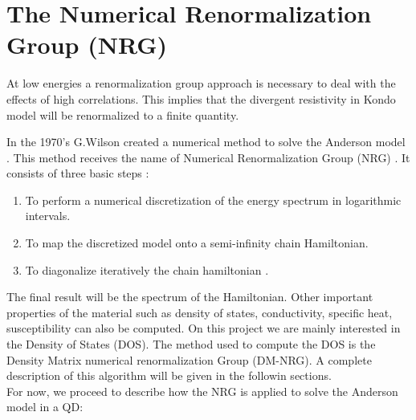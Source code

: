 \newpage












\section{The Numerical Renormalization Group\label{sec:The-Numerical-Renormaliztion} (NRG) }

 

At low energies a renormalization group approach is necessary to deal with the effects of high correlations. This implies that the divergent resistivity in Kondo model will be renormalized to a finite quantity. 
 


In the 1970's G.Wilson created a numerical method to solve the Anderson model . This method receives the name of Numerical Renormalization Group (NRG) \citep{bulla_numerical_2008,wilson_renormalization_1975,krishna-murthy_renormalization-group_1980}. It consists of three basic steps :
\begin{enumerate}
\item To perform a numerical discretization of the energy spectrum in logarithmic intervals. 
\item To map the discretized model onto a semi-infinity chain Hamiltonian. 
\item  To diagonalize iteratively the chain hamiltonian . 
\end{enumerate}

The final result will be the spectrum of the Hamiltonian. Other important properties of the material such as density of states, conductivity, specific heat, susceptibility can also be computed. On this project we are mainly interested in the Density of States (DOS). The method used to compute the DOS is the Density Matrix numerical renormalization Group (DM-NRG). A complete description of this algorithm will be given in the followin sections.  \\

For now, we proceed to describe how the NRG is applied to solve the Anderson model in a QD:\\


